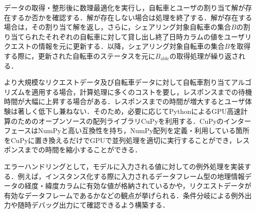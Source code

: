           \par データの取得・整形後に数理最適化を実行し，自転車とユーザの割り当て解が存在するか否かを確認する．解が存在しない場合は処理を終了する．解が存在する場合は，その割り当て解を返し，さらに，シェアリング対象自転車の集合$B$の割り当てられたそれぞれの自転車に対して貸し出し終了日時カラムの値をユーザリクエストの情報を元に更新する．以降，シェアリング対象自転車の集合$B$を取得する際に，更新された自転車のステータスを元に$B_{\text{able}}$の取得処理が繰り返される．
          \par より大規模なリクエストデータ及び自転車データに対して自転車割り当てアルゴリズムを適用する場合，計算処理に多くのコストを要し，レスポンスまでの待機時間が大幅に上昇する場合がある．レスポンスまでの時間が増大するとユーザ体験は著しく低下し兼ねない．そのため，必要に応じてPythonによるGPU高速計算のためのオープンソースの配列ライブラリCuPyを利用する．CuPyのインターフェースはNumPyと高い互換性を持ち，NumPy配列を定義・利用している箇所をCuPyに置き換えるだけでGPUで並列処理を適切に実行することができ，レスポンスまでの時間を縮小することができる．
          \par エラーハンドリングとして，モデルに入力される値に対しての例外処理を実装する．例えば，インスタンス化する際に入力されるデータフレーム型の地理情報データの経度・緯度カラムに有効な値が格納されているかや，リクエストデータが有効なデータフレームであるかなどの観点が挙げられる．条件分岐による例外出力や随時デバッグ出力にて確認できるよう構築する．

